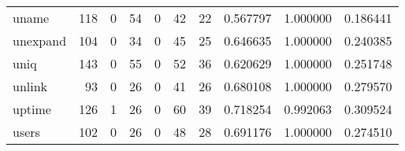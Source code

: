 \begin{tabular}{lrrrrrrrrr}
uname     &                                                118 &                                                  0 &                                                 54 &                                                  0 &                                                 42 &                                                 22 &                                           0.567797 &                               1.000000 &                             0.186441 \\
unexpand  &                                                104 &                                                  0 &                                                 34 &                                                  0 &                                                 45 &                                                 25 &                                           0.646635 &                               1.000000 &                             0.240385 \\
uniq      &                                                143 &                                                  0 &                                                 55 &                                                  0 &                                                 52 &                                                 36 &                                           0.620629 &                               1.000000 &                             0.251748 \\
unlink    &                                                 93 &                                                  0 &                                                 26 &                                                  0 &                                                 41 &                                                 26 &                                           0.680108 &                               1.000000 &                             0.279570 \\
uptime    &                                                126 &                                                  1 &                                                 26 &                                                  0 &                                                 60 &                                                 39 &                                           0.718254 &                               0.992063 &                             0.309524 \\
users     &                                                102 &                                                  0 &                                                 26 &                                                  0 &                                                 48 &                                                 28 &                                           0.691176 &                               1.000000 &                             0.274510 \\

\end{tabular}

